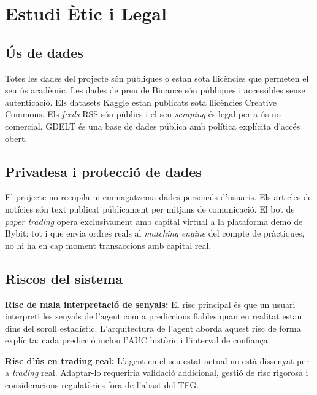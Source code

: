 \documentclass[12pt, a4paper]{report}
\begin{document}
\chapter{Estudi Ètic i Legal}

\section{Ús de dades}

Totes les dades del projecte són públiques o estan sota llicències que permeten el seu ús acadèmic. Les dades de preu de Binance són públiques i accessibles sense autenticació. Els datasets Kaggle estan publicats sota llicències Creative Commons. Els \textit{feeds} RSS són públics i el seu \textit{scraping} és legal per a ús no comercial. GDELT és una base de dades pública amb política explícita d'accés obert.

\section{Privadesa i protecció de dades}

El projecte no recopila ni emmagatzema dades personals d'usuaris. Els articles de notícies són text publicat públicament per mitjans de comunicació. El bot de \textit{paper trading} opera exclusivament amb capital virtual a la plataforma demo de Bybit: tot i que envia ordres reals al \textit{matching engine} del compte de pràctiques, no hi ha en cap moment transaccions amb capital real.

\section{Riscos del sistema}

\textbf{Risc de mala interpretació de senyals:} El risc principal és que un usuari interpreti les senyals de l'agent com a prediccions fiables quan en realitat estan dins del soroll estadístic. L'arquitectura de l'agent aborda aquest risc de forma explícita: cada predicció inclou l'AUC històric i l'interval de confiança.

\textbf{Risc d'ús en trading real:} L'agent en el seu estat actual no està dissenyat per a \textit{trading} real. Adaptar-lo requeriria validació addicional, gestió de risc rigorosa i consideracions regulatòries fora de l'abast del TFG.
\end{document}
